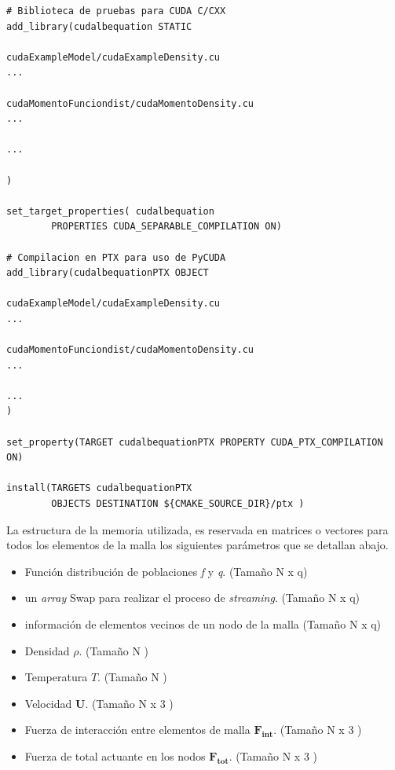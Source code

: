 \newpage
{\footnotesize
	\begin{frame}{}
		\begin{lstlisting}[frame=single]
# Biblioteca de pruebas para CUDA C/CXX
add_library(cudalbequation STATIC

cudaExampleModel/cudaExampleDensity.cu
...

cudaMomentoFunciondist/cudaMomentoDensity.cu
...

...

)

set_target_properties( cudalbequation 
		PROPERTIES CUDA_SEPARABLE_COMPILATION ON)

# Compilacion en PTX para uso de PyCUDA
add_library(cudalbequationPTX OBJECT

cudaExampleModel/cudaExampleDensity.cu
...

cudaMomentoFunciondist/cudaMomentoDensity.cu
...

...
)

set_property(TARGET cudalbequationPTX PROPERTY CUDA_PTX_COMPILATION ON)

install(TARGETS cudalbequationPTX
		OBJECTS DESTINATION ${CMAKE_SOURCE_DIR}/ptx )

		\end{lstlisting}
		
	\end{frame}
}

La estructura de la memoria utilizada, es reservada en matrices o vectores para todos los elementos de la malla los siguientes parámetros que se detallan abajo.

\begin{itemize}
	\item Función distribución de poblaciones \textit{f} y \textit{q}. (Tamaño N x q)
	\item un \textit{array} Swap para realizar el proceso de \textit{streaming}. (Tamaño N x q)
	\item información de elementos vecinos de un nodo de la malla (Tamaño N x q)
	\item Densidad $\rho$. (Tamaño N )
	\item Temperatura $T$. (Tamaño N )
	\item Velocidad $\mathbf{U}$. (Tamaño N x 3 )
	\item Fuerza de interacción entre elementos de malla $\mathbf{F_{int}}$. (Tamaño N x 3 )
	\item Fuerza de total actuante en los nodos $\mathbf{F_{tot}}$. (Tamaño N x 3 )
	
\end{itemize}

